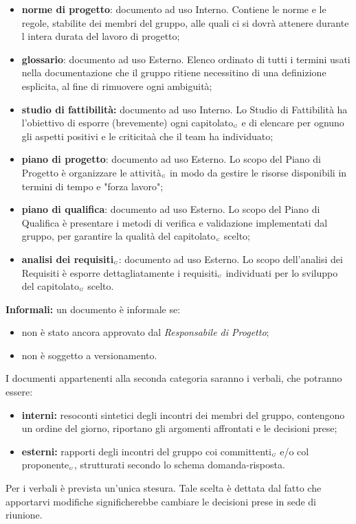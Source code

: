 \begin{itemize}
\item \textbf{norme di progetto}: documento ad uso Interno. Contiene le norme e le regole, stabilite dei membri del gruppo, alle quali ci si dovrà attenere durante l intera durata del lavoro di progetto;
	\item \textbf{glossario}: documento ad uso Esterno. Elenco ordinato di tutti i termini usati nella documentazione che il gruppo ritiene necessitino di una definizione esplicita, al fine di rimuovere ogni ambiguità;
		\item \textbf{studio di fattibilità:} documento ad uso Interno. Lo Studio di Fattibilità ha l’obiettivo di esporre (brevemente) ogni capitolato$_{\scaleto{G}{3pt}}$ e di elencare per ognuno gli aspetti positivi e le criticitaà che il team ha individuato;
			\item \textbf{piano di progetto}: documento ad uso Esterno. Lo scopo del Piano di Progetto è organizzare le attività$_{\scaleto{G}{3pt}}$ in modo da gestire le risorse disponibili in termini di tempo e "forza lavoro";
				\item \textbf{piano di qualifica}: documento ad uso Esterno. Lo scopo del Piano di Qualifica è presentare i metodi di verifica e validazione implementati dal gruppo, per garantire la qualità del capitolato$_{\scaleto{G}{3pt}}$ scelto;
					\item \textbf{analisi dei requisiti$_{\scaleto{G}{3pt}}$}: documento ad uso Esterno. Lo scopo dell'analisi dei Requisiti è esporre dettagliatamente i requisiti$_{\scaleto{G}{3pt}}$ individuati per lo sviluppo del capitolato$_{\scaleto{G}{3pt}}$ scelto.
\end{itemize}
 \textbf{Informali:} un documento è informale se:
\begin{itemize}
\item non è stato ancora approvato dal \textit{Responsabile di Progetto};
	\item non è soggetto a versionamento.
\end{itemize}
I documenti appartenenti alla seconda categoria saranno i verbali, che potranno
essere:
\begin{itemize}
\item \textbf{interni:} resoconti sintetici degli incontri dei membri del gruppo, contengono un ordine del giorno, riportano gli argomenti affrontati e le decisioni prese;
	\item \textbf{esterni:} rapporti degli incontri del gruppo coi committenti$_{\scaleto{G}{3pt}}$ e/o col proponente$_{\scaleto{G}{3pt}}$, strutturati secondo lo schema domanda-risposta.
\end{itemize}
Per i verbali è prevista un’unica stesura. Tale scelta è dettata dal fatto che apportarvi modifiche significherebbe cambiare le decisioni prese in sede di riunione.
